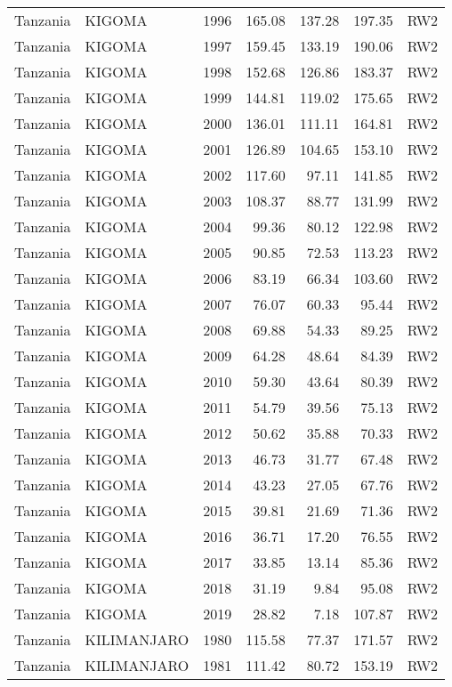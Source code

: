 \begin{longtable}{lllrrrl}
  Tanzania & KIGOMA & 1996 & 165.08 & 137.28 & 197.35 & RW2 \\ 
  Tanzania & KIGOMA & 1997 & 159.45 & 133.19 & 190.06 & RW2 \\ 
  Tanzania & KIGOMA & 1998 & 152.68 & 126.86 & 183.37 & RW2 \\ 
  Tanzania & KIGOMA & 1999 & 144.81 & 119.02 & 175.65 & RW2 \\ 
  Tanzania & KIGOMA & 2000 & 136.01 & 111.11 & 164.81 & RW2 \\ 
  Tanzania & KIGOMA & 2001 & 126.89 & 104.65 & 153.10 & RW2 \\ 
  Tanzania & KIGOMA & 2002 & 117.60 & 97.11 & 141.85 & RW2 \\ 
  Tanzania & KIGOMA & 2003 & 108.37 & 88.77 & 131.99 & RW2 \\ 
  Tanzania & KIGOMA & 2004 & 99.36 & 80.12 & 122.98 & RW2 \\ 
  Tanzania & KIGOMA & 2005 & 90.85 & 72.53 & 113.23 & RW2 \\ 
  Tanzania & KIGOMA & 2006 & 83.19 & 66.34 & 103.60 & RW2 \\ 
  Tanzania & KIGOMA & 2007 & 76.07 & 60.33 & 95.44 & RW2 \\ 
  Tanzania & KIGOMA & 2008 & 69.88 & 54.33 & 89.25 & RW2 \\ 
  Tanzania & KIGOMA & 2009 & 64.28 & 48.64 & 84.39 & RW2 \\ 
  Tanzania & KIGOMA & 2010 & 59.30 & 43.64 & 80.39 & RW2 \\ 
  Tanzania & KIGOMA & 2011 & 54.79 & 39.56 & 75.13 & RW2 \\ 
  Tanzania & KIGOMA & 2012 & 50.62 & 35.88 & 70.33 & RW2 \\ 
  Tanzania & KIGOMA & 2013 & 46.73 & 31.77 & 67.48 & RW2 \\ 
  Tanzania & KIGOMA & 2014 & 43.23 & 27.05 & 67.76 & RW2 \\ 
  Tanzania & KIGOMA & 2015 & 39.81 & 21.69 & 71.36 & RW2 \\ 
  Tanzania & KIGOMA & 2016 & 36.71 & 17.20 & 76.55 & RW2 \\ 
  Tanzania & KIGOMA & 2017 & 33.85 & 13.14 & 85.36 & RW2 \\ 
  Tanzania & KIGOMA & 2018 & 31.19 & 9.84 & 95.08 & RW2 \\ 
  Tanzania & KIGOMA & 2019 & 28.82 & 7.18 & 107.87 & RW2 \\ 
  Tanzania & KILIMANJARO & 1980 & 115.58 & 77.37 & 171.57 & RW2 \\ 
  Tanzania & KILIMANJARO & 1981 & 111.42 & 80.72 & 153.19 & RW2 \\ 

\end{longtable}
